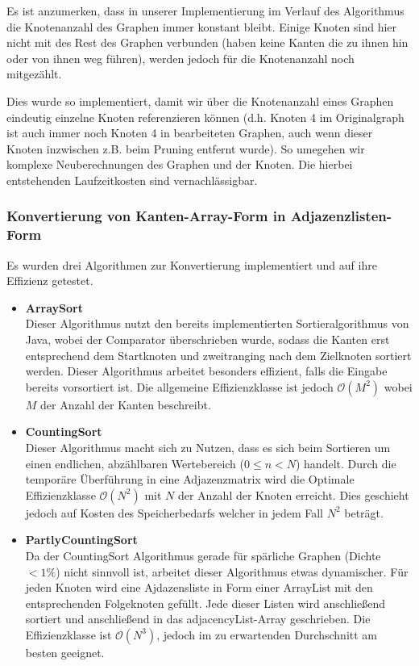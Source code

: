 \documentclass[a4paper,10pt]{article}
\begin{document}
Es ist anzumerken, dass in unserer Implementierung im Verlauf des Algorithmus die Knotenanzahl des Graphen immer konstant bleibt. Einige Knoten sind hier nicht mit des Rest des Graphen verbunden (haben keine Kanten die zu ihnen hin oder von ihnen weg führen), werden jedoch für die Knotenanzahl noch mitgezählt.
\smallskip

Dies wurde so implementiert, damit wir über die Knotenanzahl eines Graphen eindeutig einzelne Knoten referenzieren können (d.h. Knoten 4 im Originalgraph ist auch immer noch Knoten 4 in bearbeiteten Graphen, auch wenn dieser Knoten inzwischen z.B. beim Pruning entfernt wurde). So umegehen wir komplexe Neuberechnungen des Graphen und der Knoten. Die hierbei entstehenden Laufzeitkosten sind vernachlässigbar.   

\subsubsection{Konvertierung von Kanten-Array-Form in Adjazenzlisten-Form}
Es wurden drei Algorithmen zur Konvertierung implementiert und auf ihre Effizienz getestet.

\begin{itemize}
\item\textbf{ArraySort}\\
Dieser Algorithmus nutzt den bereits implementierten Sortieralgorithmus von Java, wobei der Comparator überschrieben wurde,
sodass die Kanten erst entsprechend dem Startknoten und zweitranging nach dem Zielknoten sortiert werden. Dieser Algorithmus arbeitet
besonders effizient, falls die Eingabe bereits vorsortiert ist. Die allgemeine Effizienzklasse ist jedoch $\mathcal{O}(M^2)$ wobei $M$ der Anzahl der Kanten beschreibt.
\item\textbf{CountingSort}\\
Dieser Algorithmus macht sich zu Nutzen, dass es sich beim Sortieren um einen endlichen, abzählbaren Wertebereich ($0 \le n < N$) handelt.
Durch die temporäre Überführung in eine Adjazenzmatrix wird die Optimale Effizienzklasse $\mathcal{O}(N^2)$ mit $N$ der Anzahl der Knoten erreicht.
Dies geschieht jedoch auf Kosten des Speicherbedarfs welcher in jedem Fall $N^2$ beträgt.
\item\textbf{PartlyCountingSort}\\
Da der CountingSort Algorithmus gerade für spärliche Graphen (Dichte $< 1\%$) nicht sinnvoll ist, arbeitet dieser Algorithmus etwas dynamischer.
Für jeden Knoten wird eine Ajdazensliste in Form einer ArrayList mit den entsprechenden Folgeknoten gefüllt. Jede dieser Listen wird anschließend sortiert
und anschließend in das adjacencyList-Array geschrieben. Die Effizienzklasse ist $\mathcal{O}(N^3)$, jedoch im zu erwartenden Durchschnitt am besten geeignet.
\end{itemize}
\end{document}
